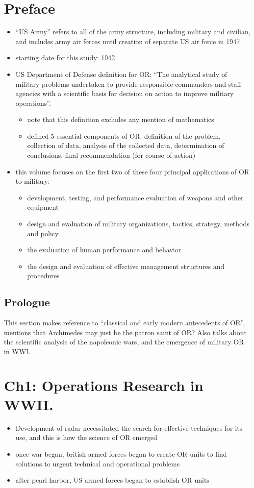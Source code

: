 \documentclass{article}
\begin{document}
\section{Preface}
\begin{itemize}
\item ``US Army'' refers to all of the army structure, including military and civilian, and includes army air forces until creation of separate US air force in 1947
\item starting date for this study: 1942
\item US Department of Defense definition for OR: ``The analytical study of military problems undertaken to provide responsible commanders and staff agencies with a scientific basis for decision on action to improve military operations''.
\begin{itemize}
\item note that this definition excludes any mention of mathematics
\item defined 5 essential components of OR: definition of the problem, collection of data, analysis of the collected data, determination of conclusions, final recommendation (for course of action)
\end{itemize}
\item this volume focuses on the first two of these four principal applications of OR to military: 
\begin{itemize}
\item development, testing, and performance evaluation of weapons and other equipment
\item design and evaluation of military organizations, tactics, strategy, methods and policy
\item the evaluation of human performance and behavior
\item the design and evaluation of effective management structures and procedures
\end{itemize}
\end{itemize}
\subsection{Prologue}
This section makes reference to ``classical and early modern antecedents of OR'', mentions that Archimedes may just be the patron saint of OR? Also talks about the scientific analysis of the napoleonic wars, and the emergence of military OR in WWI.

%
%
\section{Ch1: Operations Research in WWII.}
\begin{itemize}
\item Development of radar necessitated the search for effective techniques for its use, and this is how the science of OR emerged
\item once war began, british armed forces began to create OR units to find solutions to urgent technical and operational problems
\item after pearl harbor, US armed forces began to establish OR units
\end{itemize}
\end{document}
